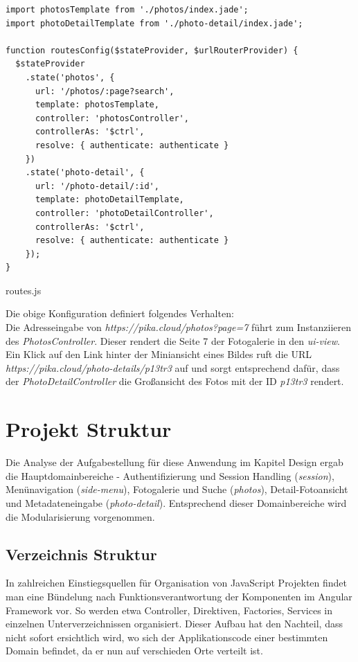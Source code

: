 \begin{listing}[H]
\begin{verbatim}
import photosTemplate from './photos/index.jade';
import photoDetailTemplate from './photo-detail/index.jade';

function routesConfig($stateProvider, $urlRouterProvider) {
  $stateProvider
    .state('photos', {
      url: '/photos/:page?search',
      template: photosTemplate,
      controller: 'photosController',
      controllerAs: '$ctrl',
      resolve: { authenticate: authenticate }
    })
    .state('photo-detail', {
      url: '/photo-detail/:id',
      template: photoDetailTemplate,
      controller: 'photoDetailController',
      controllerAs: '$ctrl',
      resolve: { authenticate: authenticate }
    });
}

\end{verbatim}
\caption{routes.js}
\label{lst:routing_config}
\end{listing}

Die obige Konfiguration definiert folgendes Verhalten: \\
Die Adresseingabe von \textit{https://pika.cloud/photos?page=7} führt zum Instanziieren des \textit{PhotosController}. Dieser rendert die Seite 7 der Fotogalerie in den \textit{ui-view}. Ein Klick auf den Link hinter der Miniansicht eines Bildes ruft die URL \textit{https://pika.cloud/photo-details/p13tr3} auf und sorgt entsprechend dafür, dass der \textit{PhotoDetailController} die Großansicht des Fotos mit der ID  \textit{p13tr3} rendert.

\section{Projekt Struktur}
\label{sec:project_structure}

Die Analyse der Aufgabestellung für diese Anwendung im Kapitel Design ergab die Hauptdomainbereiche -  Authentifizierung und Session Handling (\textit{session}), Menünavigation (\textit{side-menu}), Fotogalerie und Suche (\textit{photos}), Detail-Fotoansicht und Metadateneingabe (\textit{photo-detail}). Entsprechend dieser Domainbereiche wird die Modularisierung vorgenommen.

\subsection{Verzeichnis Struktur}

In zahlreichen Einstiegsquellen für Organisation von JavaScript Projekten findet man eine Bündelung nach Funktionsverantwortung der Komponenten im Angular Framework vor. So werden etwa Controller, Direktiven, Factories, Services in einzelnen Unterverzeichnissen organisiert. Dieser Aufbau hat den Nachteil, dass nicht sofort ersichtlich wird, wo sich der Applikationscode einer bestimmten Domain befindet, da er nun auf verschieden Orte verteilt ist.

